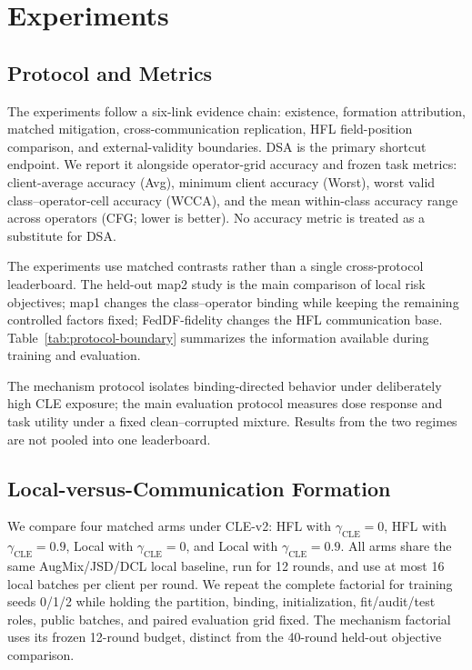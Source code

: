\section{Experiments}

\subsection{Protocol and Metrics}

The experiments follow a six-link evidence chain: existence, formation attribution, matched mitigation, cross-communication replication, HFL field-position comparison, and external-validity boundaries. DSA is the primary shortcut endpoint. We report it alongside operator-grid accuracy and frozen task metrics: client-average accuracy (Avg), minimum client accuracy (Worst), worst valid class--operator-cell accuracy (WCCA), and the mean within-class accuracy range across operators (CFG; lower is better). No accuracy metric is treated as a substitute for DSA.

The experiments use matched contrasts rather than a single cross-protocol leaderboard. The held-out map2 study is the main comparison of local risk objectives; map1 changes the class--operator binding while keeping the remaining controlled factors fixed; FedDF-fidelity changes the HFL communication base. Table~\ref{tab:protocol-boundary} summarizes the information available during training and evaluation.




The mechanism protocol isolates binding-directed behavior under deliberately high CLE exposure; the main evaluation protocol measures dose response and task utility under a fixed clean--corrupted mixture. Results from the two regimes are not pooled into one leaderboard.

\subsection{Local-versus-Communication Formation}

We compare four matched arms under CLE-v2: HFL with \(\gamma_{\mathrm{CLE}}=0\), HFL with \(\gamma_{\mathrm{CLE}}=0.9\), Local with \(\gamma_{\mathrm{CLE}}=0\), and Local with \(\gamma_{\mathrm{CLE}}=0.9\). All arms share the same AugMix/JSD/DCL local baseline, run for 12 rounds, and use at most 16 local batches per client per round. We repeat the complete factorial for training seeds 0/1/2 while holding the partition, binding, initialization, fit/audit/test roles, public batches, and paired evaluation grid fixed. The mechanism factorial uses its frozen 12-round budget, distinct from the 40-round held-out objective comparison.

